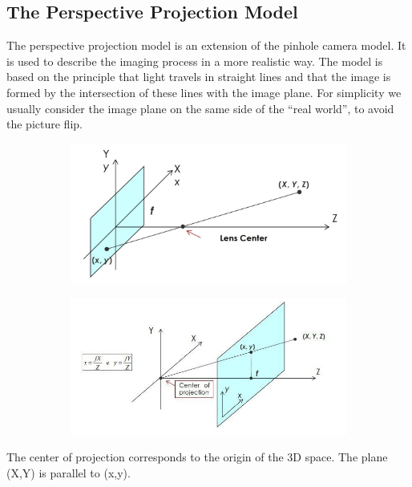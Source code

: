 \subsection{The Perspective Projection Model}
The perspective projection model is an extension of the pinhole camera model. It is used to describe the imaging process in a more realistic way. The model is based on the principle that light travels in straight lines and that the image is formed by the intersection of these lines with the image plane. 
For simplicity we usually consider the image plane on the same side of the “real world”, to avoid the picture flip.
\begin{figure}[h]
    \begin{subfigure}{0.5\textwidth}
        \includegraphics[scale=0.2]{Figures/Perspective_proj1.jpeg} 
        \label{fig:subim1}
    \end{subfigure}
    \begin{subfigure}{0.5\textwidth}
        \includegraphics[scale=0.4]{Figures/Perspective_proj.jpeg}
        \label{fig:subim2}
    \end{subfigure}
        \label{fig:image2}
\end{figure}
The center of projection corresponds to the origin of the 3D space. The plane (X,Y) is parallel to (x,y). 
